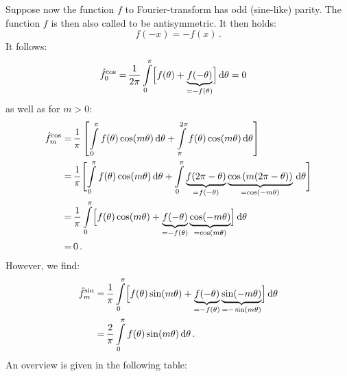 Suppose now the function $f$ to Fourier-transform has odd (sine-like) parity.
The function $f$ is then also called to be antisymmetric.
It then holds:
\begin{equation}
  f(-x) = -f(x) \, .
\end{equation}
It follows:
\begin{align}
 \hat{f}_0^\mathrm{cos}
  =&\, \frac{1}{2 \pi} \int\limits_{0}^{\pi} \Bigl[  f(\theta) + \underbrace{f(- \theta)}_{=-f(\theta)} \Bigr] \,\mathrm{d}\theta
  =    0
\end{align}
as well as for $m>0$:
\begin{align}
 \hat{f}_m^\mathrm{cos}
  =&\, \frac{1}{\pi} \left[   \int\limits_{  0}^{ \pi} f(\theta) \cos(m \theta) \,\mathrm{d}\theta
                            + \int\limits_{\pi}^{2\pi} f(\theta) \cos(m \theta) \,\mathrm{d}\theta \right] \nonumber \\
  =&\, \frac{1}{\pi} \Biggl[  \int\limits_{0}^{\pi} f(\theta) \cos(m \theta) \,\mathrm{d}\theta
                            + \int\limits_{0}^{\pi} \underbrace{f(2 \pi - \theta)}_{=f(-\theta)} \underbrace{\cos\left(m (2 \pi - \theta)\right)}_{=\cos(- m \theta)} \,\mathrm{d}\theta \Biggr] \nonumber \\
  =&\, \frac{1}{\pi} \int\limits_{0}^{\pi} \Bigl[ f(  \theta)                           \cos(  m \theta)
                                    + \underbrace{f(- \theta)}_{=-f(\theta)} \underbrace{\cos(- m \theta)}_{=\cos(m \theta)} \Bigr] \,\mathrm{d}\theta \nonumber \\
  =&\, 0 \, .
\end{align}
However, we find:
\begin{align}
 \hat{f}_m^\mathrm{sin}
  =&\, \frac{1}{\pi} \int\limits_{0}^{\pi} \Bigl[ f(  \theta)                            \sin(  m \theta)
                                    + \underbrace{f(- \theta)}_{=-f(\theta)} \underbrace{\sin(- m \theta)}_{=-\sin(m \theta)} \Bigr] \,\mathrm{d}\theta \nonumber \\
  =&\, \frac{2}{\pi} \int\limits_{0}^{\pi} f(\theta) \sin(m \theta) \,\mathrm{d}\theta \, .
\end{align}
An overview is given in the following table:
